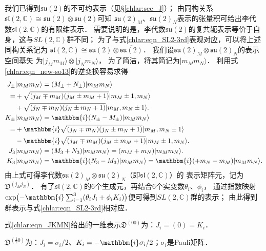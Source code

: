 我们已得到$\mathfrak{su}(2)$的不可约表示（见\S\ref{chlar:sec_J}）；
由同构关系$\mathfrak{sl}(2,\mathbb{C}) \cong \mathfrak{su}(2)\otimes\mathfrak{su}(2)$可知
$\mathfrak{su}(2)_M $、$\mathfrak{su}(2)_N$表示的张量积可给出李代数$\mathfrak{sl}(2,\mathbb{C})$的有限维表示．
需要说明的是，李代数$\mathfrak{su}(2)$的复共轭表示等价于自身，这与$SL(2,\mathbb{C})$群不同；
为了与式\eqref{chlar:eqn_SL2-3rd}表观对应，可以将上述同构关系记为
$\mathfrak{sl}(2,\mathbb{C}) \cong \mathfrak{su}(2)\otimes \overline{\mathfrak{su}(2)}$．
我们设$\mathfrak{su}(2)_M\otimes{\mathfrak{su}(2)_N}$的表示空间基矢
为$|j_M m_M\rangle \otimes {|j_N m_N\rangle}$，
为了简洁，将其简记为$|m_M {m_N} \rangle$．
利用式\eqref{chlar:eqn_new-so13}的逆变换容易求得
\begin{subequations}\label{chlar:eqn_JKMN}
\begin{align}
    J_{\pm} &|m_M {m_N} \rangle = (M_{\pm}+N_{\pm})|m_M {m_N} \rangle \notag \\
    =&+\sqrt{(j_M\mp m_M)(j_M\pm m_M+1)} |m_M\pm 1, {m_N} \rangle \notag \\
    &+\sqrt{(j_N\mp m_N)(j_N\pm m_N+1)} |m_M, {m_N\pm 1}\rangle . \label{chlar:eqn_JpmMNpm} \\
    K_{\pm} &|m_M {m_N} \rangle = \mathbbm{i}(N_{\pm}-M_{\pm})|m_M {m_N} \rangle \notag \\
    =& +\mathbbm{i}\sqrt{(j_N\mp m_N)(j_N\pm m_N+1)} |m_M, {m_N\pm 1}\rangle\notag \\
    &-\mathbbm{i}\sqrt{(j_M\mp m_M)(j_M\pm m_M+1)} | m_M\pm 1, {m_N}\rangle  . \\
    J_3 &|m_M {m_N} \rangle = (M_3+N_3) |m_M {m_N}\rangle = (m_M + m_N)|m_M {m_N}\rangle . \\
    K_3 &|m_M {m_N}\rangle  = \mathbbm{i}(N_3-M_3) | m_M {m_N}\rangle
    = \mathbbm{i} (+m_N-m_M)|m_M {m_N}\rangle  . \label{chlar:eqn_K3MN3}
\end{align}\end{subequations}
由上式可得李代数$\mathfrak{su}(2)_M\otimes{\mathfrak{su}(2)}_N$（即$\mathfrak{sl}(2,\mathbb{C})$）的
表示矩阵元，记为$\mathfrak{D}^{(j_M j_N)}$．
有了$\mathfrak{sl}(2,\mathbb{C})$的6个生成元，再结合6个实变数$\theta_i$、$\phi_i$，
通过指数映射$\exp\bigl(-\mathbbm{i}\sum_{i=1}^{3}(\theta_i J_i + \phi_i K_i)\bigr)$便可得到$SL(2,\mathbb{C})$群的表示；
由此得到群表示与式\eqref{chlar:eqn_SL2-3rd}相对应．

式\eqref{chlar:eqn_JKMN}给出的一维表示$\mathfrak{D}^{(00)}$为：$J_i=(0)=K_i$．

$\mathfrak{D}^{(\frac{1}{2}0)}$为：$J_i = \sigma_i/2$、$K_i =-\mathbbm{i} \sigma_i/2$；$\sigma_i$是Pauli矩阵．

